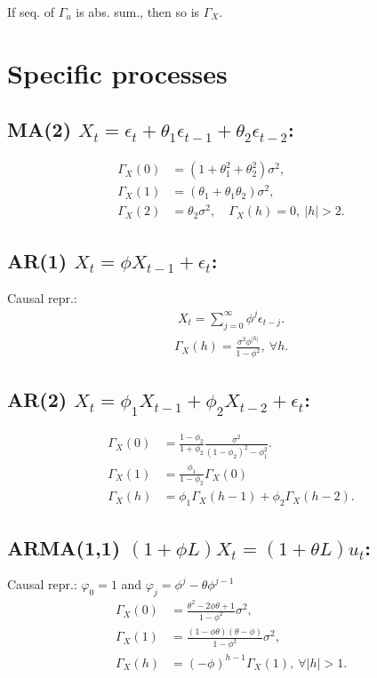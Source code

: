 \documentclass[9pt]{extarticle}
\begin{document}
\begin{multicols*}{4}
If seq. of $\Gamma_u$ is abs. sum., then so is $\Gamma_X$.










\section*{Specific processes}
\subsection*{MA(2) $X_t = \epsilon_t + \theta_1 \epsilon_{t-1} + \theta_2 \epsilon_{t-2}$:}
\begin{align*}
    \Gamma_X(0) &= (1+\theta_1^2 + \theta_2^2)\sigma^2, \\
    \Gamma_X(1) &= (\theta_1 + \theta_1\theta_2)\sigma^2, \\
    \Gamma_X(2) &= \theta_2 \sigma^2, \quad \Gamma_X(h) = 0, ~|h| > 2.
\end{align*}

\subsection*{AR(1) $X_t = \phi X_{t-1} + \epsilon_t$:}
Causal repr.:
\begin{align*}
    X_t = \sum_{j=0}^\infty \phi^{j} \epsilon_{t-j}.
\end{align*}
\begin{align*}
    \Gamma_X(h) = \frac{\sigma^2 \phi^{|h|}}{1 - \phi^2},~\forall h.
\end{align*}

\subsection*{AR(2) $X_t = \phi_1X_{t-1} + \phi_2 X_{t-2} + \epsilon_t$:}
\begin{align*}
    \Gamma_X(0) &= \frac{1-\phi_2}{1 + \phi_2}\frac{\sigma^2}{(1-\phi_2)^2 - \phi_1^2}. \\
    \Gamma_X(1) &= \frac{\phi_1}{1-\phi_2}\Gamma_X(0) \\
    \Gamma_X(h) &= \phi_1 \Gamma_X(h-1) + \phi_2 \Gamma_X(h-2).
\end{align*}

\subsection*{ARMA(1,1) $(1+\phi L)X_t = (1+\theta L)u_t$:} 
Causal repr.: $\varphi_0 = 1$ and $\varphi_j = \phi^j - \theta \phi^{j-1}$
\begin{align*}
    \Gamma_X(0) &= \frac{\theta^2 - 2\phi\theta + 1}{1-\phi^2}\sigma^2, \\
    \Gamma_X(1) &= \frac{(1-\phi\theta)(\theta - \phi)}{1-\phi^2}\sigma^2, \\
    \Gamma_X(h) &= (-\phi)^{h-1} \Gamma_X(1), ~\forall |h| > 1.
\end{align*}











\end{multicols*}
\end{document}
